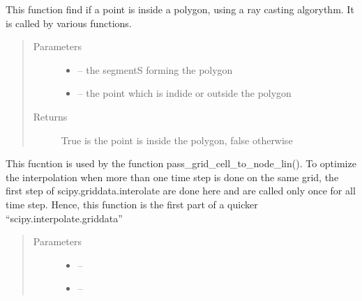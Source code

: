 \documentclass[letterpaper,10pt,english]{sphinxmanual}
\begin{document}

\begin{fulllineitems}
\label{\detokenize{index:src.manage_grid_8.inside_polygon}}
This function find if a point is inside a polygon, using a ray casting algorythm. It is called by various functions.
\begin{quote}\begin{description}
\item[{Parameters}] \leavevmode\begin{itemize}
\item {} 
 -- the segmentS forming the polygon

\item {} 
 -- the point which is indide or outside the polygon

\end{itemize}

\item[{Returns}] \leavevmode
True is the point is inside the polygon, false otherwise

\end{description}\end{quote}

\end{fulllineitems}


\begin{fulllineitems}
\label{\detokenize{index:src.manage_grid_8.interp_weights}}
This fucntion is used by the function pass\_grid\_cell\_to\_node\_lin(). To optimize the interpolation when more than one time step
is done on the same grid, the first step of scipy.griddata.interolate are done here and are called only once for all
time step. Hence, this function is the first part of a quicker ``scipy.interpolate.griddata''
\begin{quote}\begin{description}
\item[{Parameters}] \leavevmode\begin{itemize}
\item {} 
 -- 

\item {} 
 -- 

\end{itemize}

\end{description}\end{quote}

\end{fulllineitems}
\end{document}
